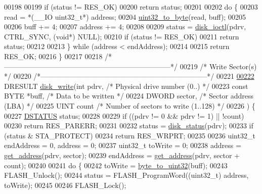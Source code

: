 \begin{DoxyCode}
00198 
00199   \textcolor{keywordflow}{if} (status != RES\_OK)
00200     \textcolor{keywordflow}{return} status;
00201 
00202   \textcolor{keywordflow}{do} \{
00203     read = *(\_\_IO uint32\_t*) address;
00204     \hyperlink{diskio_8c_ae214680b2ed5e6b6f4785c517f73c5b3}{uint32\_to\_byte}(read, buff);
00205 
00206     buff += 4;
00207     address += 4;
00208 
00209     status = \hyperlink{diskio_8c_a816bffc54e390c15d03f477133707de5}{disk\_ioctl}(pdrv, CTRL\_SYNC, (\textcolor{keywordtype}{void}*) NULL);
00210     \textcolor{keywordflow}{if} (status != RES\_OK)
00211       \textcolor{keywordflow}{return} status;
00212 
00213   \} \textcolor{keywordflow}{while} (address < endAddress);
00214 
00215   \textcolor{keywordflow}{return} RES\_OK;
00216 \}
00217 
00218 \textcolor{comment}{/*-----------------------------------------------------------------------*/}
00219 \textcolor{comment}{/* Write Sector(s)                                                       */}
00220 \textcolor{comment}{/*-----------------------------------------------------------------------*/}
00221 
\hypertarget{diskio_8c_source_l00222}{}\hyperlink{diskio_8h_a4fc55609dc0b2fba35c679984ae7ca68}{00222} DRESULT \hyperlink{diskio_8c_a4fc55609dc0b2fba35c679984ae7ca68}{disk\_write}(\textcolor{keywordtype}{int} pdrv, \textcolor{comment}{/* Physical drive number (0..) */}
00223 \textcolor{keyword}{const} BYTE *buff, \textcolor{comment}{/* Data to be written */}
00224 DWORD sector, \textcolor{comment}{/* Sector address (LBA) */}
00225 UINT count \textcolor{comment}{/* Number of sectors to write (1..128) */}
00226 ) \{
00227   \hyperlink{diskio_8h_adba6790898ce4029c20a34b898ce73c1}{DSTATUS} status;
00228 
00229   \textcolor{keywordflow}{if} ((pdrv != 0 && pdrv != 1) || !count)
00230     \textcolor{keywordflow}{return} RES\_PARERR;
00231 
00232   status = \hyperlink{diskio_8c_a308c9b0a83724bf6e6aae72a736cc7a6}{disk\_status}(pdrv);
00233   \textcolor{keywordflow}{if} (status & STA\_PROTECT)
00234     \textcolor{keywordflow}{return} RES\_WRPRT;
00235 
00236   uint32\_t endAddress = 0, address = 0;
00237   uint32\_t toWrite = 0;
00238   address = \hyperlink{diskio_8c_a713082e3e5375e658a941a3cca667aed}{get\_address}(pdrv, sector);
00239   endAddress = \hyperlink{diskio_8c_a713082e3e5375e658a941a3cca667aed}{get\_address}(pdrv, sector + count);
00240 
00241   \textcolor{keywordflow}{do} \{
00242     toWrite = \hyperlink{diskio_8c_a900718135e0cd4b363dddcdb44175607}{byte\_to\_uint32}(buff);
00243     FLASH\_Unlock();
00244     status = FLASH\_ProgramWord((uint32\_t) address, toWrite);
00245 
00246     FLASH\_Lock();

\end{DoxyCode}
